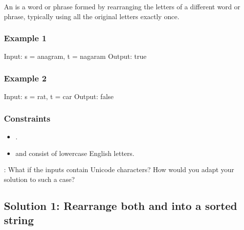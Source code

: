 \documentclass[letterpaper,12pt,english]{book}
\begin{document}
\sphinxAtStartPar
An  is a word or phrase formed by rearranging the letters of a different word or phrase, typically using all the original letters exactly once.


\subsubsection{Example 1}
\label{\detokenize{String/08_STR_242_Valid_Anagram:example-1}}
\begin{sphinxVerbatim}[commandchars=\\\{\}]
Input: s = \PYGZdq{}anagram\PYGZdq{}, t = \PYGZdq{}nagaram\PYGZdq{}
Output: true
\end{sphinxVerbatim}


\subsubsection{Example 2}
\label{\detokenize{String/08_STR_242_Valid_Anagram:example-2}}
\begin{sphinxVerbatim}[commandchars=\\\{\}]
Input: s = \PYGZdq{}rat\PYGZdq{}, t = \PYGZdq{}car\PYGZdq{}
Output: false
\end{sphinxVerbatim}


\subsubsection{Constraints}
\label{\detokenize{String/08_STR_242_Valid_Anagram:constraints}}\begin{itemize}
\item {} 
\sphinxAtStartPar
{}.

\item {} 
\sphinxAtStartPar
{} and  consist of lowercase English letters.

\end{itemize}

\sphinxAtStartPar
{}: What if the inputs contain Unicode characters? How would you adapt your solution to such a case?


\subsection{Solution 1: Rearrange both  and  into a sorted string}
\label{\detokenize{String/08_STR_242_Valid_Anagram:solution-1-rearrange-both-s-and-t-into-a-sorted-string}}
\end{document}
